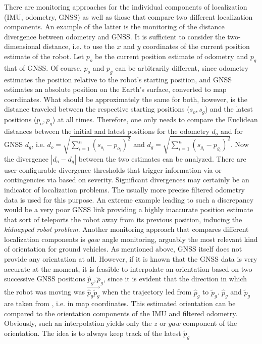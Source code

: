 \documentclass[english, master, utf8]{base/thesis_KBS}
\newcommand{\code}{\collectverb{\codebox}}
\begin{document}
There are monitoring approaches for the individual components of localization (IMU, odometry, GNSS) as well as those that compare two different localization components.
An example of the latter is the monitoring of the distance divergence between odometry and GNSS. It is sufficient to consider the two-dimensional distance, i.e. to use the $x$ and
$y$ coordinates of the current position estimate of the robot. Let $p_o$ be the current position estimate of odometry and $p_g$ that of GNSS. Of course, $p_o$ and $p_g$ can be
arbitrarily different, since odometry estimates the position relative to the robot's starting position, and GNSS estimates an absolute position on the Earth's surface, converted to
map coordinates. What should be approximately the same for both, however, is the distance traveled between the respective starting positions ($s_o, s_g$) and the latest positions
($p_o, p_g$) at all times. Therefore, one only needs to compare the Euclidean distances between the initial and latest positions for the odometry $d_o$ and for GNSS $d_g$,
i.e. $d_o = \sqrt{\sum_{i=1}^{n}(s_{o_i} - p_{o_i})^2}$ and $d_g = \sqrt{\sum_{i=1}^{n}(s_{g_i} - p_{g_i})^2}$. Now the divergence $|d_o - d_g|$ between the two estimates can be analyzed.
There are user-configurable divergence thresholds that trigger information via \code{/robot_info} or contingencies via \code{/contingency_preemption} based on severity. Significant
divergences may certainly be an indicator of localization problems. The usually more precise filtered odometry data is used for this purpose.
An extreme example leading to such a discrepancy would be a very poor GNSS link providing a highly inaccurate
position estimate that sort of teleports the robot away from its previous position, inducing the \textit{kidnapped robot problem}. Another monitoring approach that compares different
localization components is $yaw$ angle monitoring, arguably the most relevant kind of orientation for
ground vehicles. As mentioned above, GNSS itself does not provide any orientation at all. However, if it is known that the GNSS data is very accurate at the moment, it is feasible
to interpolate an orientation based on two successive GNSS positions $\hat{p}_g, \tilde{p}_g$, since it is evident that the direction in which the robot was moving was
$\overrightarrow{\hat{p}_g\tilde{p}_g}$ when the trajectory led from $\hat{p}_g$ to $\tilde{p}_g$. $\hat{p}_g$ and $\tilde{p}_g$ are taken from \code{/odometry/gps}, i.e. in map
coordinates. This estimated orientation can be compared to the orientation components of the
IMU and filtered odometry. Obviously, such an interpolation yields only the $z$ or $yaw$ component of the orientation. The idea is to always keep track of the latest $\tilde{p}_{g}$
\end{document}
